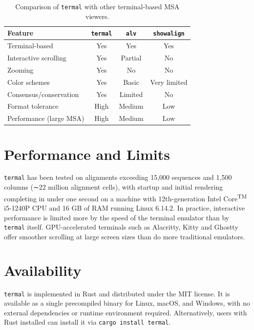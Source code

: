 \documentclass[11pt]{article}
\begin{document}
\begin{table}[h]
\centering
\begin{tabular}{lccc}
\hline
Feature                 & \texttt{termal} & \texttt{alv} & \texttt{showalign} \\
\hline
Terminal-based          & Yes             & Yes          & Yes                \\
Interactive scrolling   & Yes             & Partial      & No                 \\
Zooming                 & Yes             & No           & No                 \\
Color schemes           & Yes             & Basic        & Very limited       \\
Consensus/conservation  & Yes             & Limited      & No                 \\
Format tolerance        & High            & Medium       & Low                \\
Performance (large MSA) & High            & Medium       & Low                \\
\hline
\end{tabular}
\caption{Comparison of \texttt{termal} with other terminal-based MSA viewers.}
\label{tab:comparison}
\end{table}

\section*{Performance and Limits}

\texttt{termal} has been tested on alignments exceeding 15,000 sequences and
1,500 columns (∼22 million alignment cells), with startup and initial rendering
completing in under one second on a machine with 12th-generation
Intel\textregistered{} Core\textsuperscript{TM} i5-1240P CPU and 16 GB of RAM
running Linux 6.14.2. In practice, interactive performance is limited more by
the speed of the terminal emulator than by \texttt{termal} itself.
GPU-accelerated terminals such as Alacritty\cite{alacritty}, Kitty\cite{kitty}
and Ghostty\cite{ghostty} offer smoother scrolling at large screen sizes than do
more traditional emulators.

\section*{Availability}

\texttt{termal} is implemented in Rust and distributed under the MIT license. It
is available as a single precompiled binary for Linux, macOS, and Windows, with
no external dependencies or runtime environment required. Alternatively, users
with Rust installed can install it via \texttt{cargo install termal}.
\end{document}
